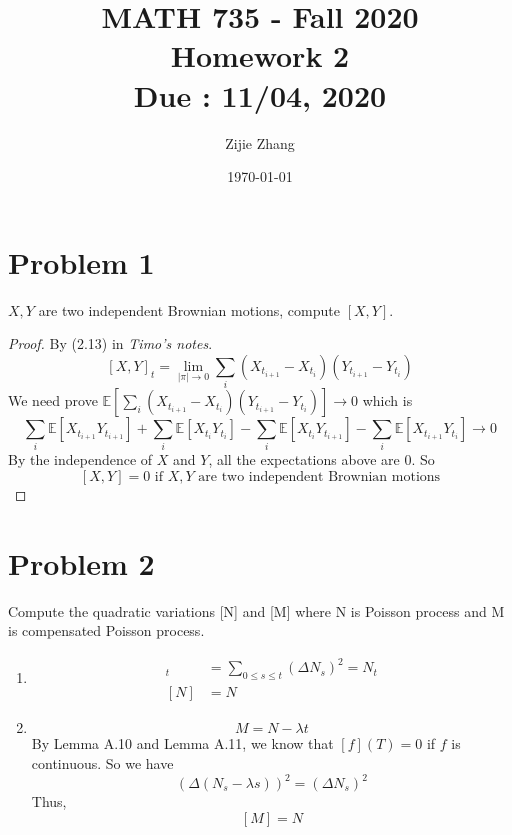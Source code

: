\documentclass{article}
\title{MATH 735 - Fall 2020\\
		{\Large \textbf{Homework 2}}\\
		{\normalsize \textbf{Due : 11/04, 2020}}
	}
\author{Zijie Zhang}
\date{\today}
\begin{document}
	\maketitle

	\section*{Problem 1}
	$X,Y$ are two independent Brownian motions, compute $[X,Y]$.
	\begin{proof}
		By (2.13) in \textit{Timo’s notes}.
		$$[X,Y]_t = \lim_{|\pi|\to 0}\sum_i(X_{t_{i+1}} - X_{t_{i}})(Y_{t_{i+1}}-Y_{t_{i}})$$
		We need prove $\mathbb{E}\left[\sum_{i}(X_{t_{i+1}} - X_{t_{i}})(Y_{t_{i+1}}-Y_{t_{i}})\right] \to 0$
		which is 
		$$\sum_i \mathbb{E}\left[X_{t_{i+1}}Y_{t_{i+1}}\right] 
		+ \sum_i \mathbb{E}\left[X_{t_{i}}Y_{t_{i}}\right]
		- \sum_i \mathbb{E}\left[X_{t_{i}}Y_{t_{i+1}}\right]
		- \sum_i \mathbb{E}\left[X_{t_{i+1}}Y_{t_{i}}\right] \to 0$$
		By the independence of $X$ and $Y$, all the expectations above are 0.
		So $$[X, Y] = 0 \text{ if } X ,Y \text{ are two independent Brownian motions}$$
	\end{proof}

	\section*{Problem 2}
	Compute the quadratic variations [N] and [M] where N is Poisson process and M is compensated Poisson process.
	\begin{enumerate}
		\item \begin{align*}
			[N]_t &= \sum_{0 \leqslant s \leqslant t}\left(\Delta N_s\right)^2 = N_t\\
			[N] &= N
		\end{align*}
		\item $$M = N - \lambda t$$
		By Lemma A.10 and Lemma A.11, we know that $[f](T) = 0$ if $f$ is continuous. So we have
		$$(\Delta(N_s - \lambda s))^2 = (\Delta N_s)^2$$
		Thus, $$[M] = N$$
	\end{enumerate}

\end{document}
